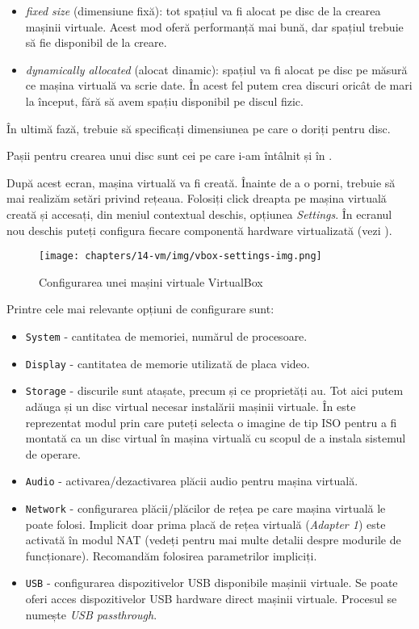 \begin{itemize}
  \item \textit{fixed size} (dimensiune fixă): tot spațiul va fi alocat pe disc de
		la crearea mașinii virtuale. Acest mod oferă performanță mai
		bună, dar spațiul trebuie să fie disponibil de la creare.
  \item \textit{dynamically allocated} (alocat dinamic): spațiul va fi alocat pe
		disc pe măsură ce mașina virtuală va scrie date. În acest fel
		putem crea discuri oricât de mari la început, fără să avem
		spațiu disponibil pe discul fizic.
\end{itemize}

În ultimă fază, trebuie să specificați dimensiunea pe care o doriți pentru disc.

Pașii pentru crearea unui disc sunt cei pe care i-am întâlnit și în .

După acest ecran, mașina virtuală va fi creată. Înainte de a o porni,
trebuie să mai realizăm setări privind rețeaua. Folosiți click dreapta
pe mașina virtuală creată și accesați, din meniul contextual deschis, opțiunea \textit{Settings}. În ecranul
nou deschis puteți configura fiecare componentă hardware virtualizată (vezi
).

\begin{figure}[!htbp]
	\centering
	\texttt{[image: chapters/14-vm/img/vbox-settings-img.png]}
	\caption{Configurarea unei mașini virtuale VirtualBox}
	\label{fig:vm:vbox-settings}
\end{figure}

Printre cele mai relevante opțiuni de configurare sunt:

\begin{itemize}
  \item \texttt{System} - cantitatea de memoriei, numărul de
		procesoare.
  \item \texttt{Display} - cantitatea de memorie utilizată de placa video.
  \item \texttt{Storage} - discurile sunt atașate, precum și ce proprietăți au.
		Tot aici putem adăuga și un disc virtual necesar instalării
		mașinii virtuale. În 
		este reprezentat modul prin care puteți selecta o imagine de tip
		ISO pentru a fi montată ca un disc virtual în mașina virtuală
		cu scopul de a instala sistemul de operare.
  \item \texttt{Audio} - activarea/dezactivarea plăcii audio pentru mașina virtuală.
  \item \texttt{Network} - configurarea plăcii/plăcilor de rețea pe care mașina
		virtuală le poate folosi. Implicit doar prima placă de rețea virtuală
		(\textit{Adapter 1}) este activată în modul NAT (vedeți
		 pentru mai multe
		detalii despre modurile de funcționare). Recomandăm folosirea
		parametrilor impliciți.
  \item \texttt{USB} - configurarea dispozitivelor USB disponibile mașinii
		virtuale. Se poate oferi acces dispozitivelor USB hardware direct
		mașinii virtuale. Procesul se numește \textit{USB passthrough}.
\end{itemize}

